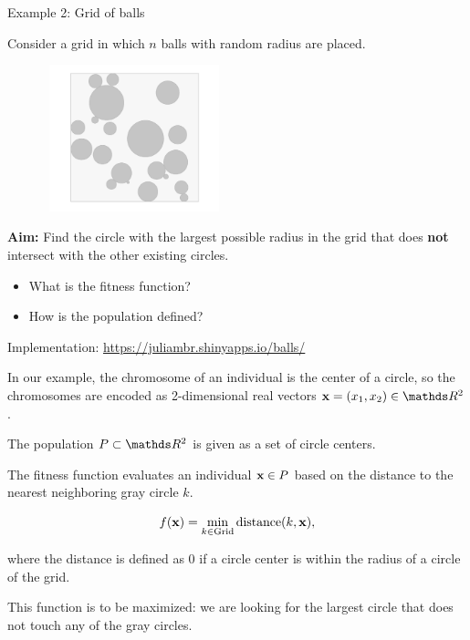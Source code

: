 \documentclass[11pt,compress,t,notes=noshow, xcolor=table]{beamer}
\begin{document}
\begin{vbframe}{Example 2: Grid of balls}

Consider a grid in which $n$ balls with random radius are placed.
\begin{center}
\begin{figure}
  \includegraphics[height = 4.25cm, width = 5.25cm]{figure_man/grid.png}
\end{figure}
\end{center}


\textbf{Aim:} Find the circle with the largest possible radius in the grid that does \textbf{not} intersect with the other existing circles.

\begin{itemize}
\item What is the fitness function?
\item How is the population defined?
\end{itemize}

Implementation: \url{https://juliambr.shinyapps.io/balls/}

\framebreak

In our example, the chromosome of an individual is the center of a circle, so the chromosomes are encoded as 2-dimensional real vectors $\xv = (x_1, x_2) \in \R^2$.

\lz

The population $P \subset \R^2$ is given as a set of circle centers.

\lz

The fitness function evaluates an individual $\mathbf{x} \in P$ based on the distance to the nearest neighboring gray circle $k$.

$$
f(\mathbf{x}) = \min_{k \in \text{Grid}} \text{distance} (k, \mathbf{x}),
$$

where the distance is defined as $0$ if a circle center is within the radius of a circle of the grid.

This function is to be maximized: we are looking for the largest circle that does not touch any of the gray circles.

\end{vbframe}



\endlecture
\end{document}

